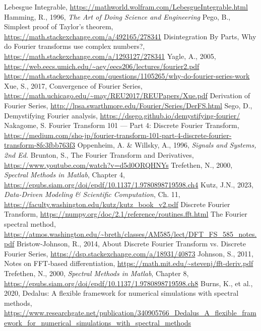 \documentclass[10pt]{article}
\begin{document}
\begin{thebibliography}{99} %
\raggedright
{}
	Lebesgue Integrable, \url{https://mathworld.wolfram.com/LebesgueIntegrable.html}
	Hamming, R., 1996, \textit{The Art of Doing Science and Engineering}
	Pego, B., Simplest proof of Taylor's theorem, \url{https://math.stackexchange.com/a/492165/278341}
	Disintegration By Parts, Why do Fourier transforms use complex numbers?, \url{https://math.stackexchange.com/a/1293127/278341}
	Yagle, A., 2005, \url{https://web.eecs.umich.edu/~aey/eecs206/lectures/fourier2.pdf}
	\url{https://math.stackexchange.com/questions/1105265/why-do-fourier-series-work}
	Xue, S., 2017, Convergence of Fourier Series, \url{https://math.uchicago.edu/~may/REU2017/REUPapers/Xue.pdf}
	Derivation of Fourier Series, \url{http://lpsa.swarthmore.edu/Fourier/Series/DerFS.html}
	Sego, D., Demystifying Fourier analysis, \url{https://dsego.github.io/demystifying-fourier/}
	Nakagome, S. Fourier Transform 101 — Part 4: Discrete Fourier Transform, \url{https://medium.com/sho-jp/fourier-transform-101-part-4-discrete-fourier-transform-8fc3fbb763f3}
	Oppenheim, A. \& Willsky, A., 1996, \textit{Signals and Systems, 2nd Ed.}
	Brunton, S., The Fourier Transform and Derivatives, \url{https://www.youtube.com/watch?v=d5d0ORQHNYs}
	Trefethen, N., 2000, \textit{Spectral Methods in Matlab}, Chapter 4, \url{https://epubs.siam.org/doi/epdf/10.1137/1.9780898719598.ch4}
	Kutz, J.N., 2023, \textit{Data-Driven Modeling \& Scientific Computation}, Ch. 11, \url{https://faculty.washington.edu/kutz/kutz_book_v2.pdf}
	Discrete Fourier Transform, \url{https://numpy.org/doc/2.1/reference/routines.fft.html}
	The Fourier spectral method, \url{https://atmos.washington.edu/~breth/classes/AM585/lect/DFT_FS_585_notes.pdf}
	Bristow-Johnson, R., 2014, About Discrete Fourier Transform vs. Discrete Fourier Series, \url{https://dsp.stackexchange.com/a/18931/40873}
	Johnson, S., 2011, Notes on FFT-based differentiation, \url{https://math.mit.edu/~stevenj/fft-deriv.pdf}
	Trefethen, N., 2000, \textit{Spectral Methods in Matlab}, Chapter 8, \url{https://epubs.siam.org/doi/epdf/10.1137/1.9780898719598.ch8}	
	Burns, K., et al., 2020, Dedalus: A flexible framework for numerical simulations with spectral methods, \url{https://www.researchgate.net/publication/340905766_Dedalus_A_flexible_framework_for_numerical_simulations_with_spectral_methods}

\end{thebibliography}
\end{document}
